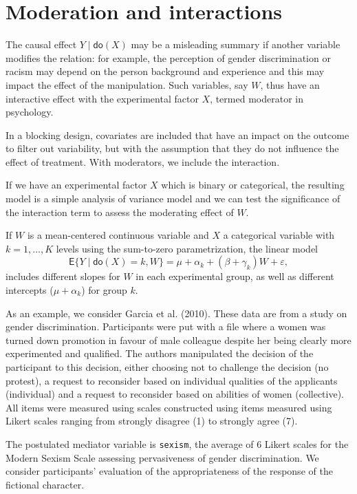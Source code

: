 \documentclass[
  11pt,
  letterpaper,
]{scrbook}
\theoremstyle{definition}
\theoremstyle{remark}
\begin{document}
\hypertarget{moderation-and-interactions}{%
\section{Moderation and
interactions}\label{moderation-and-interactions}}

The causal effect \(Y \mid \mathsf{do}(X)\) may be a misleading summary
if another variable modifies the relation: for example, the perception
of gender discrimination or racism may depend on the person background
and experience and this may impact the effect of the manipulation. Such
variables, say \(W\), thus have an interactive effect with the
experimental factor \(X\), termed moderator in psychology.

In a blocking design, covariates are included that have an impact on the
outcome to filter out variability, but with the assumption that they do
not influence the effect of treatment. With moderators, we include the
interaction.

If we have an experimental factor \(X\) which is binary or categorical,
the resulting model is a simple analysis of variance model and we can
test the significance of the interaction term to assess the moderating
effect of \(W\).

If \(W\) is a mean-centered continuous variable and \(X\) a categorical
variable with \(k=1, \ldots, K\) levels using the sum-to-zero
parametrization, the linear model
\[\mathsf{E}\{Y \mid \mathsf{do}(X) = k, W\} = \mu + \alpha_k + (\beta + \gamma_k)W + \varepsilon,\]
includes different slopes for \(W\) in each experimental group, as well
as different intercepts (\(\mu + \alpha_k\)) for group \(k\).

As an example, we consider Garcia et al. (2010). These data are from a
study on gender discrimination. Participants were put with a file where
a women was turned down promotion in favour of male colleague despite
her being clearly more experimented and qualified. The authors
manipulated the decision of the participant to this decision, either
choosing not to challenge the decision (no protest), a request to
reconsider based on individual qualities of the applicants (individual)
and a request to reconsider based on abilities of women (collective).
All items were measured using scales constructed using items measured
using Likert scales ranging from strongly disagree (1) to strongly agree
(7).

The postulated mediator variable is \texttt{sexism}, the average of 6
Likert scales for the Modern Sexism Scale assessing pervasiveness of
gender discrimination. We consider participants' evaluation of the
appropriateness of the response of the fictional character.
\end{document}
